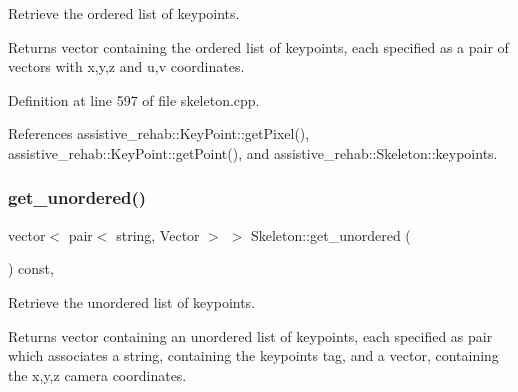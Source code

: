 Retrieve the ordered list of keypoints. 

\begin{DoxyReturn}{Returns}
vector containing the ordered list of keypoints, each specified as a pair of vectors with x,y,z and u,v coordinates. 
\end{DoxyReturn}


Definition at line 597 of file skeleton.\+cpp.


\begin{DoxyCode}{0}

\end{DoxyCode}


References assistive\+\_\+rehab\+::\+Key\+Point\+::get\+Pixel(), assistive\+\_\+rehab\+::\+Key\+Point\+::get\+Point(), and assistive\+\_\+rehab\+::\+Skeleton\+::keypoints.

\mbox{\label{classassistive__rehab_1_1Skeleton_a7b9f01b2b0f5450920335347c5861a2f}} 
\subsubsection{\texorpdfstring{get\_unordered()}{get\_unordered()}}
{\footnotesize\ttfamily vector$<$ pair$<$ string, Vector $>$ $>$ Skeleton\+::get\+\_\+unordered (\begin{DoxyParamCaption}{ }\end{DoxyParamCaption}) const\hspace{0.3cm}{\ttfamily [virtual]}, {\ttfamily [inherited]}}



Retrieve the unordered list of keypoints. 

\begin{DoxyReturn}{Returns}
vector containing an unordered list of keypoints, each specified as pair which associates a string, containing the keypoint\textquotesingle{}s tag, and a vector, containing the x,y,z camera coordinates. 
\end{DoxyReturn}


